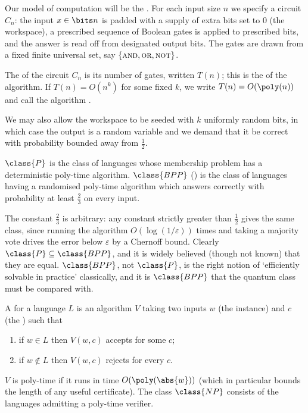 Our model of computation will be the . For each input size $n$ we specify a circuit $C_n$: the input $x \in\bits n$ is padded with a supply of extra bits set to $0$ (the workspace), a prescribed sequence of Boolean gates is applied to prescribed bits, and the answer is read off from designated output bits. The gates are drawn from a fixed finite universal set, say $\{\textsc{and},\textsc{or},\textsc{not}\}$.

\begin{definition}
	The  of the circuit $C_n$ is its number of gates, written $T(n)$; this is the  of the algorithm. If $T(n) = O(n^k)$ for some fixed $k$, we write $T(n) = O(\poly(n))$ and call the algorithm .
\end{definition}

We may also allow the workspace to be seeded with $k$ uniformly random bits, in which case the output is a random variable and we demand that it be correct with probability bounded away from $\tfrac12$.

\begin{definition}
	$\class{P}$ is the class of languages whose membership problem has a deterministic poly-time algorithm. $\class{BPP}$ () is the class of languages having a randomised poly-time algorithm which answers correctly with probability at least $\tfrac23$ on every input.
\end{definition}

The constant $\tfrac23$ is arbitrary: any constant strictly greater than $\tfrac12$ gives the same class, since running the algorithm $O(\log(1/\varepsilon))$ times and taking a majority vote drives the error below $\varepsilon$ by a Chernoff bound. Clearly $\class{P}\subseteq\class{BPP}$, and it is widely believed (though not known) that they are equal. $\class{BPP}$, not $\class{P}$, is the right notion of `efficiently solvable in practice' classically, and it is $\class{BPP}$ that the quantum class must be compared with.

\begin{definition}[$\class{NP}$]
	A  for a language $L$ is an algorithm $V$ taking two inputs $w$ (the instance) and $c$ (the ) such that
	\begin{enumerate}[label=(\roman*)]
		\item if $w \in L$ then $V(w,c)$ accepts for some $c$;
		\item if $w \notin L$ then $V(w,c)$ rejects for every $c$.
	\end{enumerate}
	$V$ is poly-time if it runs in time $O(\poly(\abs{w}))$ (which in particular bounds the length of any useful certificate). The class $\class{NP}$ consists of the languages admitting a poly-time verifier.
\end{definition}

